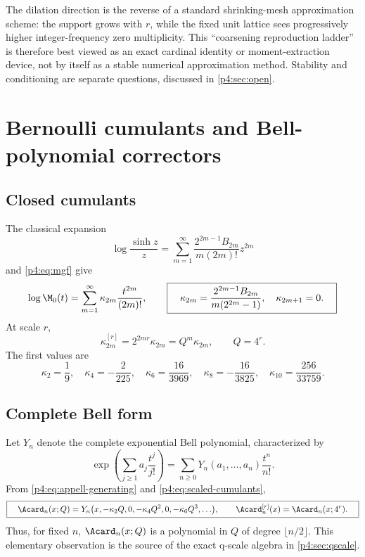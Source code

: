 \documentclass[11pt]{article}
\numberwithin{equation}{section}
\theoremstyle{definition}
\theoremstyle{remark}
\begin{document}
\begin{corpusdeductionbox}
The dilation direction is the reverse of a standard shrinking-mesh approximation scheme: the support grows with $r$, while the fixed unit lattice sees progressively higher integer-frequency zero multiplicity.  This ``coarsening reproduction ladder'' is therefore best viewed as an exact cardinal identity or moment-extraction device, not by itself as a stable numerical approximation method.  Stability and conditioning are separate questions, discussed in \cref{p4:sec:open}.
\end{corpusdeductionbox}

\section{Bernoulli cumulants and Bell-polynomial correctors}
\label{p4:sec:bernoulli-bell}

\subsection{Closed cumulants}
The classical expansion
\begin{equation}
 \log\frac{\sinh z}{z}
 =\sum_{m=1}^{\infty}
 \frac{2^{2m-1}B_{2m}}{m(2m)!}z^{2m}
 \label{p4:eq:logsinh}
\end{equation}
and \eqref{p4:eq:mgf} give
\begin{equation}
 \log\M_0(t)=\sum_{m=1}^{\infty}\kappa_{2m}\frac{t^{2m}}{(2m)!},
 \qquad
 \boxed{\quad
 \kappa_{2m}=\frac{2^{2m-1}B_{2m}}{m(2^{2m}-1)},
 \quad \kappa_{2m+1}=0.
 \quad}
 \label{p4:eq:cumulants}
\end{equation}
At scale $r$,
\begin{equation}
 \kappa_{2m}^{[r]}=2^{2mr}\kappa_{2m}=Q^m\kappa_{2m},
 \qquad Q=4^r.
 \label{p4:eq:scaled-cumulants}
\end{equation}
The first values are
\begin{equation}
 \kappa_2=\frac19,
 \quad \kappa_4=-\frac2{225},
 \quad \kappa_6=\frac{16}{3969},
 \quad \kappa_8=-\frac{16}{3825},
 \quad \kappa_{10}=\frac{256}{33759}.
 \label{p4:eq:cumulant-values}
\end{equation}

\subsection{Complete Bell form}
Let $Y_n$ denote the complete exponential Bell polynomial, characterized by
\[
 \exp\!\left(\sum_{j\ge1}a_j\frac{t^j}{j!}\right)
 =\sum_{n\ge0}Y_n(a_1,\ldots,a_n)\frac{t^n}{n!}.
\]
From \eqref{p4:eq:appell-generating} and \eqref{p4:eq:scaled-cumulants},
\begin{equation}
 \boxed{\quad
 \Acard_n(x;Q)
 =Y_n\bigl(x,-\kappa_2Q,0,-\kappa_4Q^2,0,-\kappa_6Q^3,\ldots\bigr),
 \qquad \Acard_n^{[r]}(x)=\Acard_n(x;4^r).
 \quad}
 \label{p4:eq:bell-appell}
\end{equation}
Thus, for fixed $n$, $\Acard_n(x;Q)$ is a polynomial in $Q$ of degree $\lfloor n/2\rfloor$.  This elementary observation is the source of the exact q-scale algebra in \cref{p4:sec:qscale}.
\end{document}
